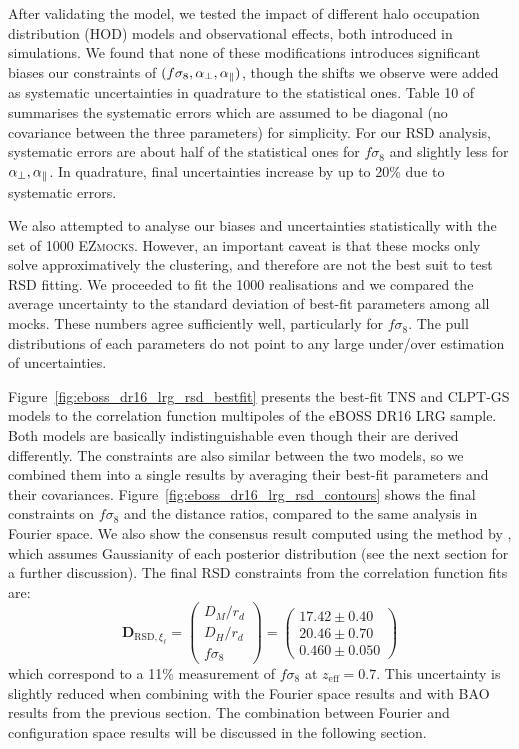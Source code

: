 After validating the model, we tested the impact of different halo occupation distribution (HOD) models 
and observational effects, both introduced in simulations. We found that none of these modifications 
introduces significant biases our constraints of $(f\sigma_8, {\alpha_\perp}, {\alpha_\parallel})$, though the shifts we observe 
were added as systematic uncertainties in quadrature to the statistical ones. 
Table 10 of \cite{bautistaCompletedSDSSIVExtended2021} summarises the systematic errors which are assumed to be
diagonal (no covariance between the three parameters) for simplicity. For our RSD analysis, 
systematic errors are about half of the statistical ones for $f\sigma_8$ and slightly less for ${\alpha_\perp}, {\alpha_\parallel}$. 
In quadrature, final uncertainties increase by up to 20\% due to systematic errors. 

We also attempted to analyse our biases and uncertainties statistically with the set of 1000 \textsc{EZmocks}. 
However, an important caveat is that these mocks only solve approximatively the clustering, and therefore are not 
the best suit to test RSD fitting. We proceeded to fit the 1000 realisations and we compared 
the average uncertainty to the standard deviation of best-fit parameters among all mocks. These numbers 
agree sufficiently well, particularly for $f\sigma_8$. The pull distributions of each parameters do not 
point to any large under/over estimation of uncertainties.  

Figure~\ref{fig:eboss_dr16_lrg_rsd_bestfit} presents the best-fit TNS and CLPT-GS models to the correlation function 
multipoles of the eBOSS DR16 LRG sample. 
Both models are basically indistinguishable even though their are derived differently. The constraints are also 
similar between the two models, so we combined them into a single results by averaging their best-fit parameters 
and their covariances. 
Figure~\ref{fig:eboss_dr16_lrg_rsd_contours} shows the final constraints on $f\sigma_8$ and the distance ratios, 
compared to the same analysis in Fourier space. We also show the consensus result computed using the method 
by \cite{sanchezClusteringGalaxiesCompleted2017a}, which assumes Gaussianity of each posterior distribution 
(see the next section for a further discussion). 
The final RSD constraints from the correlation function fits are:
\begin{equation}
    \mathbf{D}_{\text{RSD}, {\xi_\ell}} =  
    \begin{pmatrix}
   D_M/r_d \\
   D_H/r_d \\
   f\sigma_8 
    \end{pmatrix}=
    \begin{pmatrix}
    17.42 \pm 0.40 \\
    20.46 \pm 0.70 \\
    0.460 \pm 0.050
    \end{pmatrix}
\end{equation}
which correspond to a 11\% measurement of $f\sigma_8$ at $z_\text{eff} = 0.7$. 
This uncertainty is slightly reduced when combining with the Fourier space results 
and with BAO results from the previous section. 
The combination between Fourier and configuration space results
will be discussed in the following section. 

